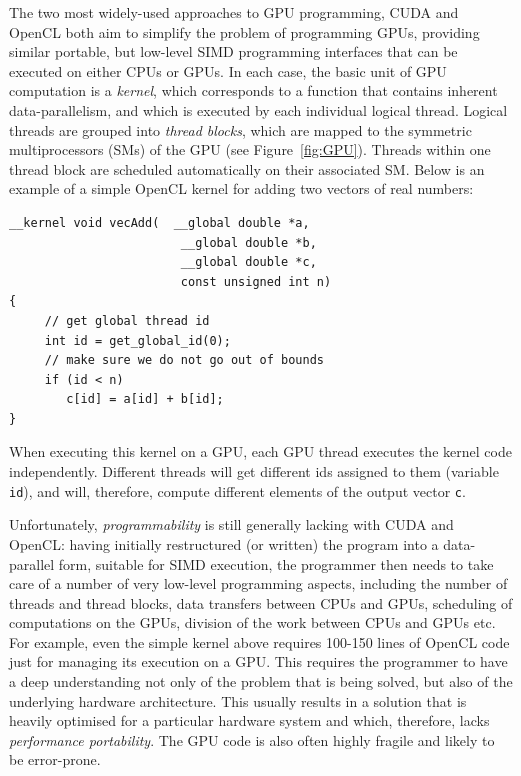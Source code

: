 \documentclass[final]{jfp1}
\begin{document}
The two most widely-used approaches to GPU programming, 
CUDA and OpenCL both aim to simplify the problem of programming GPUs, providing
similar portable, but low-level SIMD programming interfaces that can be executed on either CPUs or GPUs.
In each case, the basic unit of GPU computation is a \emph{kernel}, which
corresponds to a function that contains inherent data-parallelism, and which is
executed by each individual logical thread. Logical threads
are grouped into \emph{thread blocks}, which are mapped to
the symmetric multiprocessors (SMs) of the GPU (see Figure~\ref{fig:GPU}). 
Threads within one thread block are scheduled automatically on
their associated SM. Below is an example of a simple OpenCL kernel for adding two
vectors of real numbers:
\begin{lstlisting}
__kernel void vecAdd(  __global double *a,   
                        __global double *b,                       
                        __global double *c,                  
                        const unsigned int n)                    
{                                                               
     // get global thread id
     int id = get_global_id(0);                                  
     // make sure we do not go out of bounds                      
     if (id < n)                                                 
        c[id] = a[id] + b[id];                                  
}                                                               
\end{lstlisting}
When executing this kernel on a GPU, each GPU thread executes the kernel code independently. 
Different threads will get different ids assigned to them (variable \lstinline{id}), and will, therefore,
compute different elements of the output vector \lstinline{c}. 

Unfortunately, \emph{programmability} is still generally lacking
with CUDA and OpenCL: having initially restructured (or written) the
program into a data-parallel form, suitable for SIMD execution,
the programmer then needs to take care of a number of very low-level programming
aspects, including the number of threads and thread blocks,  data transfers between CPUs and GPUs, scheduling of 
computations on the GPUs, division of the work between CPUs and GPUs etc.
For example, even the simple kernel above requires 100-150 lines of 
OpenCL code just for managing its execution on a GPU.
This requires the programmer to have a deep understanding not only of
the problem that is being solved, but also of the underlying hardware 
architecture.  This usually results in a solution that is heavily optimised
for a particular hardware system and which, therefore, lacks \emph{performance 
portability}. The GPU code is also often highly fragile and likely to be error-prone.
\end{document}
